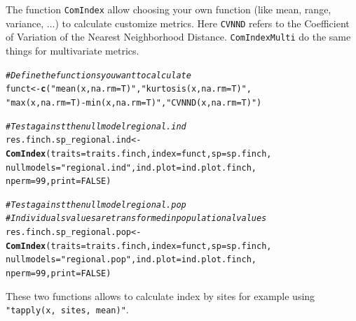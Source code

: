\documentclass[12pt]{article}\usepackage[]{graphicx}\usepackage[]{color}
\makeatletter
\newcommand{\hlnum}[1]{\textcolor[rgb]{0.686,0.059,0.569}{#1}}%
\newcommand{\hlstr}[1]{\textcolor[rgb]{0.192,0.494,0.8}{#1}}%
\newcommand{\hlcom}[1]{\textcolor[rgb]{0.678,0.584,0.686}{\textit{#1}}}%
\newcommand{\hlstd}[1]{\textcolor[rgb]{0.345,0.345,0.345}{#1}}%
\newcommand{\hlkwb}[1]{\textcolor[rgb]{0.69,0.353,0.396}{#1}}%
\newcommand{\hlkwc}[1]{\textcolor[rgb]{0.333,0.667,0.333}{#1}}%
\newcommand{\hlkwd}[1]{\textcolor[rgb]{0.737,0.353,0.396}{\textbf{#1}}}%
\newenvironment{kframe}{%
 \def\at@end@of@kframe{}%
 \ifinner\ifhmode%
  \def\at@end@of@kframe{\end{minipage}}%
  \begin{minipage}{\columnwidth}%
 \fi\fi%
 \def\FrameCommand##1{\hskip\@totalleftmargin \hskip-\fboxsep
 \colorbox{shadecolor}{##1}\hskip-\fboxsep
     \hskip-\linewidth \hskip-\@totalleftmargin \hskip\columnwidth}%
 \MakeFramed {\advance\hsize-\width
   \@totalleftmargin\z@ \linewidth\hsize
   \@setminipage}}%
 {\par\unskip\endMakeFramed%
 \at@end@of@kframe}
\newenvironment{knitrout}{}{} %
\newcommand{\code}[1]{{{\tt #1}}}
\makeatother
\begin{document}
The function \texttt{ComIndex} allow choosing your own function (like mean, range, variance, ...) to calculate customize metrics. Here \texttt{CVNND} refers to the Coefficient of Variation of the Nearest Neighborhood Distance. \texttt{ComIndexMulti} do the same things for multivariate metrics. 

\begin{knitrout}
\color{fgcolor}\begin{kframe}
\begin{alltt}
\hlcom{#Define the functions you want to calculate}
\hlstd{funct}\hlkwb{<-}\hlkwd{c}\hlstd{(}\hlstr{"mean(x, na.rm = T)"}\hlstd{,} \hlstr{"kurtosis(x, na.rm = T)"}\hlstd{,}
     \hlstr{"max(x, na.rm = T) - min(x, na.rm = T)"}\hlstd{,} \hlstr{"CVNND(x, na.rm = T)"} \hlstd{)}

\hlcom{#Test against the null model regional.ind}
\hlstd{res.finch.sp_regional.ind}\hlkwb{<-}\hlkwd{ComIndex}\hlstd{(}\hlkwc{traits} \hlstd{= traits.finch,} \hlkwc{index} \hlstd{= funct,} \hlkwc{sp} \hlstd{= sp.finch,}
                           \hlkwc{nullmodels} \hlstd{=} \hlstr{"regional.ind"}\hlstd{,} \hlkwc{ind.plot} \hlstd{= ind.plot.finch,}
                            \hlkwc{nperm} \hlstd{=} \hlnum{99}\hlstd{,} \hlkwc{print} \hlstd{=} \hlnum{FALSE}\hlstd{)}

\hlcom{#Test against the null model regional.pop}
\hlcom{#Individuals values are transformed in populational values}
\hlstd{res.finch.sp_regional.pop}\hlkwb{<-}\hlkwd{ComIndex}\hlstd{(}\hlkwc{traits} \hlstd{= traits.finch,} \hlkwc{index} \hlstd{= funct,} \hlkwc{sp} \hlstd{= sp.finch,}
               \hlkwc{nullmodels} \hlstd{=} \hlstr{"regional.pop"}\hlstd{,} \hlkwc{ind.plot} \hlstd{= ind.plot.finch,}
               \hlkwc{nperm} \hlstd{=} \hlnum{99}\hlstd{,} \hlkwc{print} \hlstd{=} \hlnum{FALSE}\hlstd{)}
\end{alltt}
\end{kframe}
\end{knitrout}

These two functions allows to calculate  index by sites for example using \code{"tapply(x, sites, mean)"}.
\end{document}
